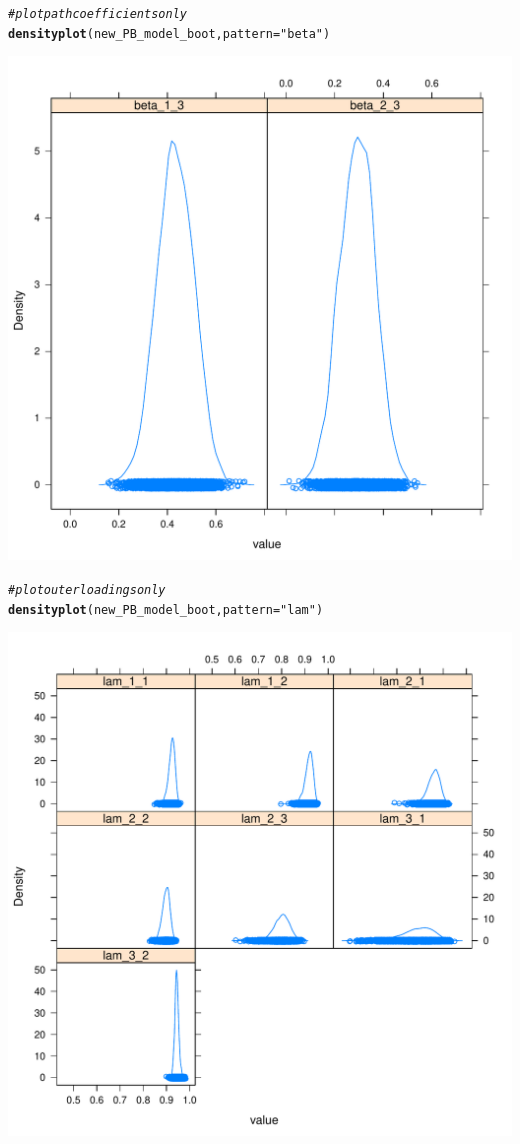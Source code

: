 \documentclass{article}\usepackage[]{graphicx}\usepackage[]{color}
\makeatletter
\def\maxwidth{ %
  \ifdim\Gin@nat@width>\linewidth
    \linewidth
  \else
    \Gin@nat@width
  \fi
}
\newcommand{\hlstr}[1]{\textcolor[rgb]{0.192,0.494,0.8}{#1}}%
\newcommand{\hlcom}[1]{\textcolor[rgb]{0.678,0.584,0.686}{\textit{#1}}}%
\newcommand{\hlstd}[1]{\textcolor[rgb]{0.345,0.345,0.345}{#1}}%
\newcommand{\hlkwc}[1]{\textcolor[rgb]{0.333,0.667,0.333}{#1}}%
\newcommand{\hlkwd}[1]{\textcolor[rgb]{0.737,0.353,0.396}{\textbf{#1}}}%
\newenvironment{kframe}{%
 \def\at@end@of@kframe{}%
 \ifinner\ifhmode%
  \def\at@end@of@kframe{\end{minipage}}%
  \begin{minipage}{\columnwidth}%
 \fi\fi%
 \def\FrameCommand##1{\hskip\@totalleftmargin \hskip-\fboxsep
 \colorbox{shadecolor}{##1}\hskip-\fboxsep
     \hskip-\linewidth \hskip-\@totalleftmargin \hskip\columnwidth}%
 \MakeFramed {\advance\hsize-\width
   \@totalleftmargin\z@ \linewidth\hsize
   \@setminipage}}%
 {\par\unskip\endMakeFramed%
 \at@end@of@kframe}
\newenvironment{knitrout}{}{} %
\makeatother
\begin{document}
\begin{knitrout}
\begin{kframe}\begin{alltt}
\hlcom{#plot path coefficients only}
\hlkwd{densityplot}\hlstd{(new_PB_model_boot,} \hlkwc{pattern}\hlstd{=}\hlstr{"beta"}\hlstd{)}
\end{alltt}
\end{kframe}
\includegraphics[width=\maxwidth]{figure/boot-4} 
\begin{kframe}\begin{alltt}
\hlcom{#plot outer loadings only}
\hlkwd{densityplot}\hlstd{(new_PB_model_boot,} \hlkwc{pattern}\hlstd{=}\hlstr{"lam"}\hlstd{)}
\end{alltt}
\end{kframe}
\includegraphics[width=\maxwidth]{figure/boot-5} 

\end{knitrout}
\end{document}
